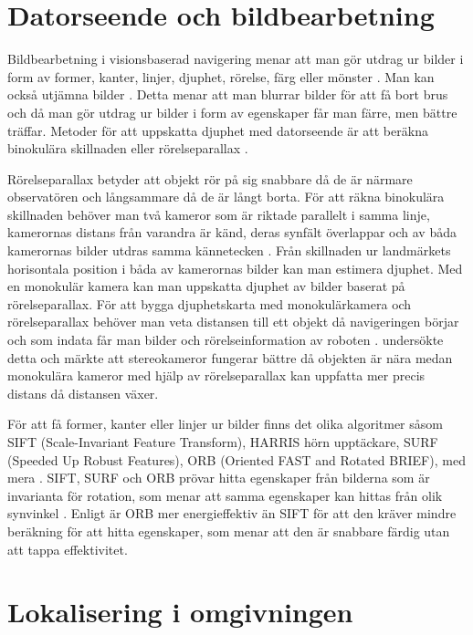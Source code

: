 \section{Datorseende och bildbearbetning}

Bildbearbetning i visionsbaserad navigering menar att man gör utdrag ur bilder i form av former, kanter, linjer, djuphet, rörelse, färg eller mönster \citep{982903}. Man kan också utjämna bilder \citep{mapbuildingsift}. Detta menar att man blurrar bilder för att få bort brus och då man gör utdrag ur bilder i form av egenskaper får man färre, men bättre träffar. Metoder för att uppskatta djuphet med datorseende är att beräkna binokulära skillnaden eller rörelseparallax \citep{suomimainittu}. 

Rörelseparallax betyder att objekt rör på sig snabbare då de är närmare observatören och långsammare då de är långt borta. För att räkna binokulära skillnaden behöver man två kameror som är riktade parallelt i samma linje, kamerornas distans från varandra är känd, deras synfält överlappar och av båda kamerornas bilder utdras samma kännetecken \citep{suomimainittu}. Från skillnaden ur landmärkets horisontala position i båda av kamerornas bilder kan man estimera djuphet. Med en monokulär kamera kan man uppskatta djuphet av bilder baserat på rörelseparallax. För att bygga djuphetskarta med monokulärkamera och rörelseparallax behöver man veta distansen till ett objekt då navigeringen börjar och som indata får man bilder och rörelseinformation av roboten \citep{suomimainittu}. \cite{suomimainittu} undersökte detta och märkte att stereokameror fungerar bättre då objekten är nära medan monokulära kameror med hjälp av rörelseparallax kan uppfatta mer precis distans då distansen växer. 

För att få former, kanter eller linjer ur bilder finns det olika algoritmer såsom SIFT (Scale-Invariant Feature Transform), HARRIS hörn upptäckare, SURF (Speeded Up Robust Features), ORB (Oriented FAST and Rotated BRIEF), med mera \citep{orb, slamproblem, mapbuildingsift}. SIFT, SURF och ORB prövar hitta egenskaper från bilderna som är invarianta för rotation, som menar att samma egenskaper kan hittas från olik synvinkel \citep{orb}. Enligt \cite{orb} är ORB mer energieffektiv än SIFT för att den kräver mindre beräkning för att hitta egenskaper, som menar att den är snabbare färdig utan att tappa effektivitet.

\section{Lokalisering i omgivningen}

